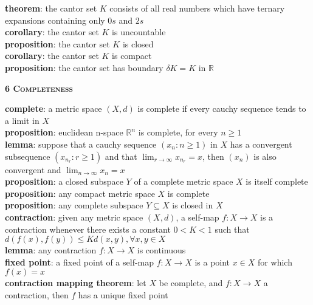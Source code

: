 \documentclass[a4paper]{article}
\begin{document}
\begin{multicols}{2}
\begin{framed}
	\noindent
	\textbf{theorem}: the cantor set $K$ consists of all real numbers which have ternary expansions containing only $0s$ and $2s$\\
	
	\noindent
	\textbf{corollary}: the cantor set $K$ is uncountable\\
	
	\noindent
	\textbf{proposition}: the cantor set $K$ is closed\\
	
	\noindent
	\textbf{corollary}: the cantor set $K$ is compact\\
	
	\noindent
	\textbf{proposition}: the cantor set has boundary $\delta K = K$ in $\mathbb{R}$
\end{framed}

\begin{framed}
	\begin{center}
		\textbf{\textsc{6 Completeness}}
	\end{center}
	\textbf{complete}: a metric space $(X, d)$ is complete if every cauchy sequence tends to a limit in $X$\\
	
	\noindent
	\textbf{proposition}: euclidean n-space $\mathbb{R}^n$ is complete, for every $n \geq 1$\\
	
	\noindent
	\textbf{lemma}: suppose that a cauchy sequence $(x_n : n \geq 1)$ in $X$ has a convergent subsequence $(x_{n_r} : r \geq 1)$ and that $\lim_{r \rightarrow \infty} x_{n_r} = x$,  then $(x_n)$ is also convergent and $\lim_{n \rightarrow \infty} x_n = x$\\
	
	\noindent
	\textbf{proposition}: a closed subspace $Y$ of a complete metric space $X$ is itself complete\\
	
	\noindent
	\textbf{proposition}: any compact metric space $X$ is complete\\
	
	\noindent
	\textbf{proposition}: any complete subspace $Y \subseteq X$ is closed in $X$\\
	
	\noindent
	\textbf{contraction}: given any metric space $(X, d)$, a self-map $f: X \rightarrow X$ is a contraction whenever there exists a constant $0 < K < 1$ such that $d(f(x), f(y)) \leq Kd(x, y), \forall x, y \in X$\\
	
	\noindent
	\textbf{lemma}: any contraction $f: X \rightarrow X$ is continuous\\
	
	\noindent
	\textbf{fixed point}: a fixed point of a self-map $f: X \rightarrow X$ is a point $x \in X$ for which $f(x) = x$\\
	
	\noindent
	\textbf{contraction mapping theorem}: let $X$ be complete, and $f: X \rightarrow X$ a contraction, then $f$ has a unique fixed point
\end{framed}
\end{multicols}
\end{document}
